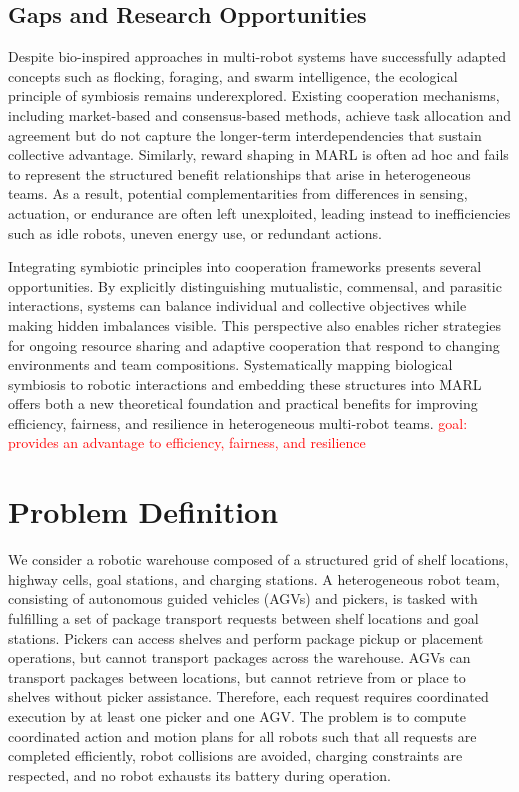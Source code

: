 \documentclass[Afour,sageh,times]{sagej}
\begin{document}
\subsection{Gaps and Research Opportunities}
Despite bio-inspired approaches in multi-robot systems have successfully adapted concepts such as flocking, foraging, and swarm intelligence, the ecological principle of symbiosis remains underexplored. Existing cooperation mechanisms, including market-based and consensus-based methods, achieve task allocation and agreement but do not capture the longer-term interdependencies that sustain collective advantage. Similarly, reward shaping in MARL is often ad hoc and fails to represent the structured benefit relationships that arise in heterogeneous teams. As a result, potential complementarities from differences in sensing, actuation, or endurance are often left unexploited, leading instead to inefficiencies such as idle robots, uneven energy use, or redundant actions.

Integrating symbiotic principles into cooperation frameworks presents several opportunities. By explicitly distinguishing mutualistic, commensal, and parasitic interactions, systems can balance individual and collective objectives while making hidden imbalances visible. This perspective also enables richer strategies for ongoing resource sharing and adaptive cooperation that respond to changing environments and team compositions. Systematically mapping biological symbiosis to robotic interactions and embedding these structures into MARL offers both a new theoretical foundation and practical benefits for improving efficiency, fairness, and resilience in heterogeneous multi-robot teams. \textcolor{red}{goal: provides an advantage to efficiency, fairness, and resilience}

\section{Problem Definition}
\label{sec:pre}

We consider a robotic warehouse composed of a structured grid of shelf locations, highway cells, goal stations, and charging stations. A heterogeneous robot team, consisting of autonomous guided vehicles (AGVs) and pickers, is tasked with fulfilling a set of package transport requests between shelf locations and goal stations. Pickers can access shelves and perform package pickup or placement operations, but cannot transport packages across the warehouse. AGVs can transport packages between locations, but cannot retrieve from or place to shelves without picker assistance. Therefore, each request requires coordinated execution by at least one picker and one AGV. The problem is to compute coordinated action and motion plans for all robots such that all requests are completed efficiently, robot collisions are avoided, charging constraints are respected, and no robot exhausts its battery during operation.
\end{document}
